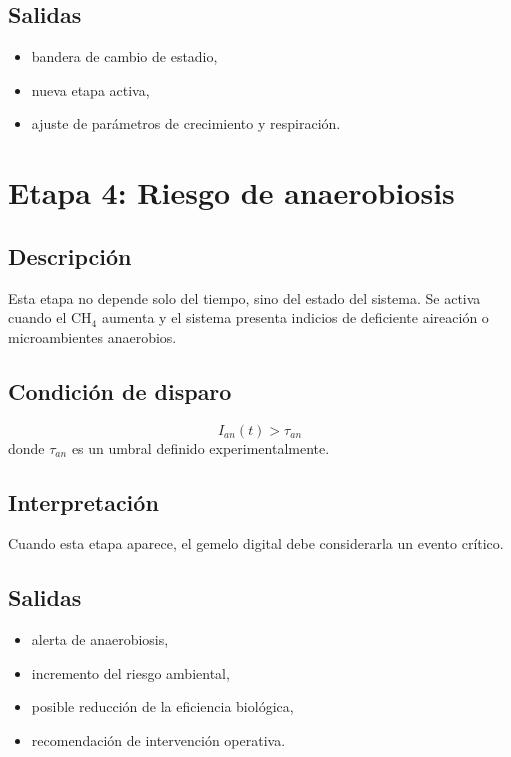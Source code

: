 \documentclass[12pt,a4paper]{report}
\begin{document}
\subsection*{Salidas}
\begin{itemize}[leftmargin=0.7cm]
    \item bandera de cambio de estadio,
    \item nueva etapa activa,
    \item ajuste de parámetros de crecimiento y respiración.
\end{itemize}

\section{Etapa 4: Riesgo de anaerobiosis}

\subsection*{Descripción}
Esta etapa no depende solo del tiempo, sino del estado del sistema. Se activa cuando el CH$_4$ aumenta y el sistema presenta indicios de deficiente aireación o microambientes anaerobios.

\subsection*{Condición de disparo}
\begin{equation}
    I_{an}(t) > \tau_{an}
\end{equation}
donde \(\tau_{an}\) es un umbral definido experimentalmente.

\subsection*{Interpretación}
Cuando esta etapa aparece, el gemelo digital debe considerarla un evento crítico.

\subsection*{Salidas}
\begin{itemize}[leftmargin=0.7cm]
    \item alerta de anaerobiosis,
    \item incremento del riesgo ambiental,
    \item posible reducción de la eficiencia biológica,
    \item recomendación de intervención operativa.
\end{itemize}
\end{document}
